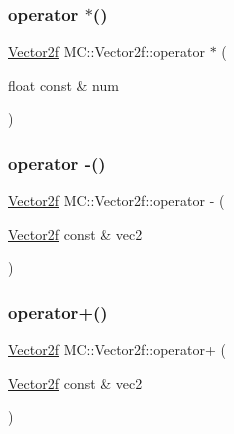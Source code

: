 \subsubsection{\texorpdfstring{operator $\ast$()}{operator *()}}
{\footnotesize\ttfamily \mbox{\hyperlink{struct_m_c_1_1_vector2f}{Vector2f}} M\+C\+::\+Vector2f\+::operator $\ast$ (\begin{DoxyParamCaption}\item[{float const \&}]{num }\end{DoxyParamCaption})\hspace{0.3cm}{\ttfamily [inline]}}

\mbox{\label{struct_m_c_1_1_vector2f_a5075657a1f5ec3e47f3ea19c10e6718e}} 
\subsubsection{\texorpdfstring{operator -\/()}{operator -()}}
{\footnotesize\ttfamily \mbox{\hyperlink{struct_m_c_1_1_vector2f}{Vector2f}} M\+C\+::\+Vector2f\+::operator -\/ (\begin{DoxyParamCaption}\item[{\mbox{\hyperlink{struct_m_c_1_1_vector2f}{Vector2f}} const \&}]{vec2 }\end{DoxyParamCaption})\hspace{0.3cm}{\ttfamily [inline]}}

\mbox{\label{struct_m_c_1_1_vector2f_a428501356ff26bfee72d1e5f39c3364e}} 
\subsubsection{\texorpdfstring{operator+()}{operator+()}}
{\footnotesize\ttfamily \mbox{\hyperlink{struct_m_c_1_1_vector2f}{Vector2f}} M\+C\+::\+Vector2f\+::operator+ (\begin{DoxyParamCaption}\item[{\mbox{\hyperlink{struct_m_c_1_1_vector2f}{Vector2f}} const \&}]{vec2 }\end{DoxyParamCaption})\hspace{0.3cm}{\ttfamily [inline]}}

\mbox{\label{struct_m_c_1_1_vector2f_a25b7fb78549176e548b85fcc4a4f9a31}} 
